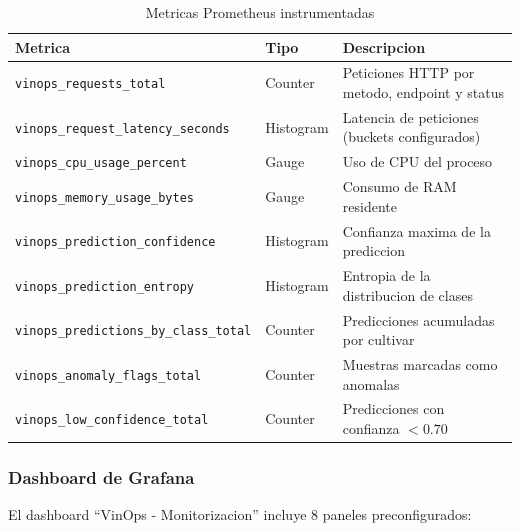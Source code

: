 \begin{table}[htbp]
\centering
\caption{Metricas Prometheus instrumentadas}
\label{tab:metricas-prometheus}
\begin{tabular}{@{}llp{5cm}@{}}
\toprule
\textbf{Metrica} & \textbf{Tipo} & \textbf{Descripcion} \\
\midrule
\texttt{vinops\_requests\_total} & Counter & Peticiones HTTP por metodo, endpoint y status \\
\texttt{vinops\_request\_latency\_seconds} & Histogram & Latencia de peticiones (buckets configurados) \\
\texttt{vinops\_cpu\_usage\_percent} & Gauge & Uso de CPU del proceso \\
\texttt{vinops\_memory\_usage\_bytes} & Gauge & Consumo de RAM residente \\
\texttt{vinops\_prediction\_confidence} & Histogram & Confianza maxima de la prediccion \\
\texttt{vinops\_prediction\_entropy} & Histogram & Entropia de la distribucion de clases \\
\texttt{vinops\_predictions\_by\_class\_total} & Counter & Predicciones acumuladas por cultivar \\
\texttt{vinops\_anomaly\_flags\_total} & Counter & Muestras marcadas como anomalas \\
\texttt{vinops\_low\_confidence\_total} & Counter & Predicciones con confianza $< 0.70$ \\
\bottomrule
\end{tabular}
\end{table}

\subsubsection{Dashboard de Grafana}

El dashboard ``VinOps - Monitorizacion'' incluye 8 paneles preconfigurados:

